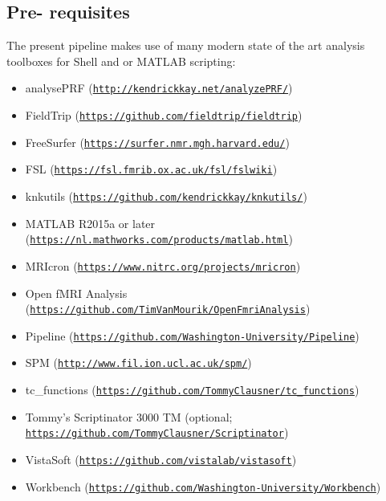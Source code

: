 \documentclass[12pt,a4paper]{scrartcl}
\begin{document}
\subsection{Pre- requisites}
\label{sec:prereq}
The present pipeline makes use of many modern state of the art analysis toolboxes for Shell and or MATLAB scripting:
\begin{itemize}
\item analysePRF (\href{http://kendrickkay.net/analyzePRF/}{\nolinkurl{http://kendrickkay.net/analyzePRF/}})
\item FieldTrip (\href{https://github.com/fieldtrip/fieldtrip}{\nolinkurl{https://github.com/fieldtrip/fieldtrip}})
\item FreeSurfer (\href{https://surfer.nmr.mgh.harvard.edu/}{\nolinkurl{https://surfer.nmr.mgh.harvard.edu/}})
\item FSL (\href{https://fsl.fmrib.ox.ac.uk/fsl/fslwiki}{\nolinkurl{https://fsl.fmrib.ox.ac.uk/fsl/fslwiki}})
\item knkutils (\href {https://github.com/kendrickkay/knkutils/}{\nolinkurl{https://github.com/kendrickkay/knkutils/}})
\item MATLAB R2015a or later (\href{https://nl.mathworks.com/products/matlab.html}{\nolinkurl{https://nl.mathworks.com/products/matlab.html}})
\item MRIcron (\href{https://www.nitrc.org/projects/mricron}{\nolinkurl{https://www.nitrc.org/projects/mricron}})
\item Open fMRI Analysis (\href{https://github.com/TimVanMourik/OpenFmriAnalysis}{\nolinkurl{https://github.com/TimVanMourik/OpenFmriAnalysis}})
\item Pipeline (\href{https://github.com/Washington-University/Pipeline}{\nolinkurl{https://github.com/Washington-University/Pipeline}})
\item SPM (\href{http://www.fil.ion.ucl.ac.uk/spm/}{\nolinkurl{http://www.fil.ion.ucl.ac.uk/spm/}})
\item tc\_functions  (\href{https://github.com/TommyClausner/tc\_functions}{\nolinkurl{https://github.com/TommyClausner/tc\_functions}})
\item Tommy's Scriptinator 3000 TM (optional; \href{https://github.com/TommyClausner/Scriptinator}{\nolinkurl{https://github.com/TommyClausner/Scriptinator}})
\item VistaSoft (\href{https://github.com/vistalab/vistasoft}{\nolinkurl{https://github.com/vistalab/vistasoft}})
\item Workbench (\href{https://github.com/Washington-University/Workbench}{\nolinkurl{https://github.com/Washington-University/Workbench}})
\end{itemize}
\end{document}
